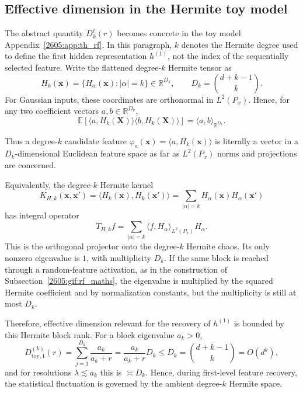 \subsection{Effective dimension in the Hermite toy model}
\label{2605:app:effective-dimension-hermite}

The abstract quantity \(D^\ell_k(r)\) becomes concrete in the toy model Appendix~\ref{2605:app:th_rf}. In this paragraph, \(k\) denotes the
Hermite degree used to define the first hidden representation \(h^{(1)}\), not
the index of the sequentially selected feature. Write the flattened degree-\(k\)
Hermite tensor as
\[
    H_k(\bm x)
    =
    \{H_\alpha(\bm x):|\alpha|=k\}
    \in \mathbb R^{D_k},
    \qquad
    D_k=\binom{d+k-1}{k}.
\]
For Gaussian inputs, these coordinates are orthonormal in \(L^2(P_x)\). Hence,
for any two coefficient vectors \(a,b\in\mathbb R^{D_k}\),
\[
    \mathbb E \left[
        \langle a,H_k(\bm X)\rangle
        \langle b,H_k(\bm X)\rangle
    \right]
    =
    \langle a,b\rangle_{\mathbb R^{D_k}} .
\]

Thus a degree-\(k\) candidate feature
\(\varphi_a(\bm x)=\langle a,H_k(\bm x)\rangle\) is literally a vector in a
\(D_k\)-dimensional Euclidean feature space as far as \(L^2(P_x)\) norms and
projections are concerned.

Equivalently, the degree-\(k\) Hermite kernel
\[
    K_{H,k}(\bm x,\bm x')
    =
    \langle H_k(\bm x),H_k(\bm x')\rangle
    =
    \sum_{|\alpha|=k} H_\alpha(\bm x)H_\alpha(\bm x')
\]
has integral operator
\[
    T_{H,k}f
    =
    \sum_{|\alpha|=k}
    \langle f,H_\alpha\rangle_{L^2(P_x)} H_\alpha .
\]
This is the orthogonal projector onto the degree-\(k\) Hermite chaos. Its only
nonzero eigenvalue is \(1\), with multiplicity \(D_k\). If the same block is
reached through a random-feature activation, as in the construction of
Subsection~\ref{2605:gif:rf_maths}, the eigenvalue is multiplied by the squared
Hermite coefficient and by normalization constants, but the multiplicity is
still at most \(D_k\).

Therefore,
effective dimension relevant for the recovery of \(h^{(1)}\) is bounded by this
Hermite block rank. For a block eigenvalue \(a_k>0\),
\[
    D_{\mathrm{toy},1}^{(k)}(r)
    =
    \sum_{j=1}^{D_k}\frac{a_k}{a_k+r}
    =
    \frac{a_k}{a_k+r}D_k
    \le D_k
    =
    \binom{d+k-1}{k}
    =
    O(d^k),
\]
and for resolutions \(\lambda\lesssim a_k\) this is
\(\asymp D_k\). Hence, during first-level
feature recovery, the statistical fluctuation is governed by the ambient
degree-\(k\) Hermite space.


